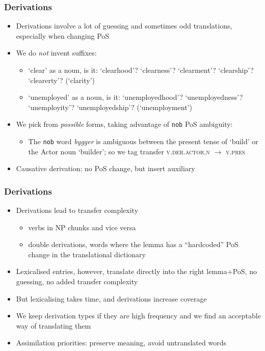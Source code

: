 \documentclass[notes=hide]{beamer}
\newcommand{\nob}{{\tt nob}}
\begin{document}
\begin{frame}\frametitle{Derivations}
  \begin{itemize}
  \item Derivations involve a lot of guessing and sometimes odd
    translations, especially when changing PoS
  \item We do \textit{not} invent suffixes:
    \begin{itemize}
    \item `clear' as a noun, is it: `clearhood'? `clearness'?
      `clearment'? `clearship'? `clearerty'? (`clarity')
    \item `unemployed' as a noun, is it: `unemployedhood'?
      `unemployedness'? `unemployity'? `unemployedship'?
      (`unemployment')
    \end{itemize}
  \item We pick from \textit{possible} forms, taking advantage of
    \nob{} PoS ambiguity:
    \begin{itemize}
    \item The \nob{} word \textit{bygger} is ambiguous between the
      present tense of `build' or the Actor noun `builder'; so we tag
      transfer \textsc{v.der.actor.n} $\rightarrow$ \textsc{v.pres}
    \end{itemize}
  \item Causative derivation: no PoS change, but insert auxiliary
  \end{itemize}
\end{frame}

\begin{frame}
  \frametitle{Derivations}
  \begin{itemize}
  \item Derivations lead to transfer complexity
    \begin{itemize}
    \item verbs in NP chunks and vice versa
    \item double derivations, words where the lemma has a
      ``hardcoded'' PoS change in the translational dictionary
    \end{itemize}
  \item Lexicalised entries, however, translate directly into the
    right lemma+PoS, no guessing, no added transfer complexity
  \item But lexicalising takes time, and derivations increase coverage
  \item We keep derivation types if they are high frequency and we
    find an acceptable way of translating them
  \item Assimilation priorities: preserve meaning, avoid untranslated
    words
  \end{itemize}
\end{frame}
\end{document}
